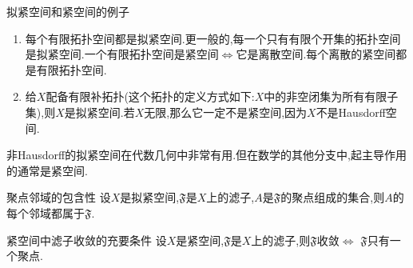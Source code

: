 \begin{example}{拟紧空间和紧空间的例子}{}
	\begin{enumerate}
		\item 每个有限拓扑空间都是拟紧空间.更一般的,每一个只有有限个开集的拓扑空间是拟紧空间.一个有限拓扑空间是紧空间$\iff$它是离散空间.每个离散的紧空间都是有限拓扑空间.
		\item 给$X$配备有限补拓扑(这个拓扑的定义方式如下:$X$中的非空闭集为所有有限子集),则$X$是拟紧空间.若$X$无限,那么它一定不是紧空间,因为$X$不是Hausdorff空间.
	\end{enumerate}
\end{example}

\begin{remark}{}{}
	非Hausdorff的拟紧空间在代数几何中非常有用.但在数学的其他分支中,起主导作用的通常是紧空间.
\end{remark}

\begin{theorem}{聚点邻域的包含性}{}
	设$X$是拟紧空间,$\mathfrak{F}$是$X$上的滤子,$A$是$\mathfrak{F}$的聚点组成的集合,则$A$的每个邻域都属于$\mathfrak{F}$.
\end{theorem}

\begin{corollary}{紧空间中滤子收敛的充要条件}{}
	设$X$是紧空间,$\mathfrak{F}$是$X$上的滤子,则$\mathfrak{F}$收敛$\iff$ $\mathfrak{F}$只有一个聚点.
\end{corollary}






